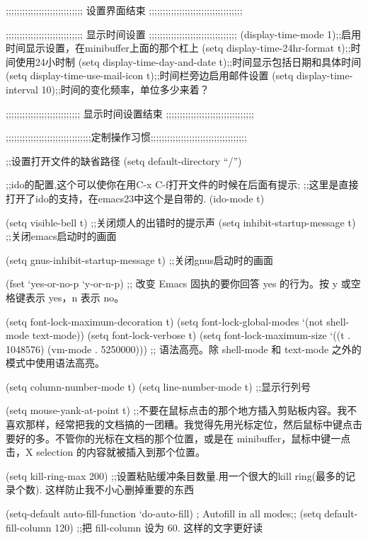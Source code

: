 \documentclass[11pt]{article}
\begin{document}
\begin{itemize}
 

;;;;;;;;;;;;;;;;;;;;;;;;;;;;  设置界面结束  ;;;;;;;;;;;;;;;;;;;;;;;;;;;;;;;;;;

 

;;;;;;;;;;;;;;;;;;;;;;;;;;;;   显示时间设置   ;;;;;;;;;;;;;;;;;;;;;;;;;;;;;;;;
(display-time-mode 1);;启用时间显示设置，在minibuffer上面的那个杠上
(setq display-time-24hr-format t);;时间使用24小时制
(setq display-time-day-and-date t);;时间显示包括日期和具体时间
(setq display-time-use-mail-icon t);;时间栏旁边启用邮件设置
(setq display-time-interval 10);;时间的变化频率，单位多少来着？
 
;;;;;;;;;;;;;;;;;;;;;;;;;;;  显示时间设置结束  ;;;;;;;;;;;;;;;;;;;;;;;;;;;;;;;;

 


;;;;;;;;;;;;;;;;;;;;;;;;;;;;;;;定制操作习惯;;;;;;;;;;;;;;;;;;;;;;;;;;;;;;;;;;;

;;设置打开文件的缺省路径
(setq default-directory ``/'')

;;ido的配置,这个可以使你在用C-x C-f打开文件的时候在后面有提示;
;;这里是直接打开了ido的支持，在emacs23中这个是自带的.
(ido-mode t)

(setq visible-bell t)
;;关闭烦人的出错时的提示声
(setq inhibit-startup-message t)
;;关闭emacs启动时的画面

(setq gnus-inhibit-startup-message t)
;;关闭gnus启动时的画面

(fset `yes-or-no-p `y-or-n-p)
;; 改变 Emacs 固执的要你回答 yes 的行为。按 y 或空格键表示 yes，n 表示 no。

(setq font-lock-maximum-decoration t)
(setq font-lock-global-modes `(not shell-mode text-mode))
(setq font-lock-verbose t)
(setq font-lock-maximum-size `((t . 1048576) (vm-mode . 5250000)))
;; 语法高亮。除 shell-mode 和 text-mode 之外的模式中使用语法高亮。

(setq column-number-mode t) 
(setq line-number-mode t)
;;显示行列号

(setq mouse-yank-at-point t)
;;不要在鼠标点击的那个地方插入剪贴板内容。我不喜欢那样，经常把我的文档搞的一团糟。我觉得先用光标定位，然后鼠标中键点击要好的多。不管你的光标在文档的那个位置，或是在 minibuffer，鼠标中键一点击，X selection 的内容就被插入到那个位置。

(setq kill-ring-max 200)
;;设置粘贴缓冲条目数量.用一个很大的kill ring(最多的记录个数). 这样防止我不小心删掉重要的东西

(setq-default auto-fill-function `do-auto-fill) 
 ; Autofill in all modes;;
(setq default-fill-column 120)
;;把 fill-column 设为 60. 这样的文字更好读


\end{itemize}
\end{document}
